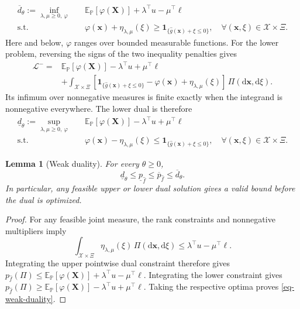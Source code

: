 \documentclass[review,11pt,3p,authoryear,nopreprintline]{elsarticle}
\newtheorem{lemma}{Lemma}
\begin{document}
\begin{equation}
  \begin{aligned}
    \overline d_\theta:=\inf_{\lambda,\mu\ge0,\ \varphi}\quad&
    \mathbb E_{\mathbb P}\left[\varphi(\bm X)\right]+\lambda^\top u-\mu^\top\ell\\
    \text{s.t.}\quad&
    \varphi(\bm x)+\eta_{\lambda,\mu}(\xi)\ge\mathbf1_{\{\hat g(\bm x)+\xi\le0\}},
    \quad\forall(\bm x,\xi)\in\mathcal X\times\Xi.
  \end{aligned}
  \label{eq-upper-measure-dual}
\end{equation}
Here and below, $\varphi$ ranges over bounded measurable functions. For the lower problem, reversing the signs of the two inequality penalties gives
\begin{equation}
  \begin{aligned}
    \mathcal L^-={}&\mathbb E_{\mathbb P}\left[\varphi(\bm X)\right]-\lambda^\top u+\mu^\top\ell\\
    &+\int_{\mathcal X\times\Xi}\left[\mathbf1_{\{\hat g(\bm x)+\xi\le0\}}-\varphi(\bm x)+\eta_{\lambda,\mu}(\xi)\right]\,\Pi\left(\mathrm d\bm x,\mathrm d\xi\right).
  \end{aligned}
  \label{eq-lower-lagrangian}
\end{equation}
Its infimum over nonnegative measures is finite exactly when the integrand is nonnegative everywhere. The lower dual is therefore
\begin{equation}
  \begin{aligned}
    \underline d_\theta:=\sup_{\lambda,\mu\ge0,\ \varphi}\quad&
    \mathbb E_{\mathbb P}\left[\varphi(\bm X)\right]-\lambda^\top u+\mu^\top\ell\\
    \text{s.t.}\quad&
    \varphi(\bm x)-\eta_{\lambda,\mu}(\xi)\le\mathbf1_{\{\hat g(\bm x)+\xi\le0\}},
    \quad\forall(\bm x,\xi)\in\mathcal X\times\Xi.
  \end{aligned}
  \label{eq-lower-measure-dual}
\end{equation}

\begin{lemma}[Weak duality]
  \label{lem-weak-duality}
  For every $\theta\ge0$,
  \begin{equation}
    \underline d_\theta\le\underline p_{\hat f}\le\overline p_{\hat f}\le\overline d_\theta.
    \label{eq-weak-duality}
  \end{equation}
  In particular, any feasible upper or lower dual solution gives a valid bound before the dual is optimized.
\end{lemma}
\begin{proof}
  For any feasible joint measure, the rank constraints and nonnegative multipliers imply
  \[
    \int_{\mathcal X\times\Xi}\eta_{\lambda,\mu}(\xi)\,\Pi\left(\mathrm d\bm x,\mathrm d\xi\right)
    \le\lambda^\top u-\mu^\top\ell.
  \]
  Integrating the upper pointwise dual constraint therefore gives
  $p_{\hat f}(\Pi)\le\mathbb E_{\mathbb P}[\varphi(\bm X)]+\lambda^\top u-\mu^\top\ell$.
  Integrating the lower constraint gives
  $p_{\hat f}(\Pi)\ge\mathbb E_{\mathbb P}[\varphi(\bm X)]-\lambda^\top u+\mu^\top\ell$.
  Taking the respective optima proves \eqref{eq-weak-duality}.
\end{proof}
\end{document}
